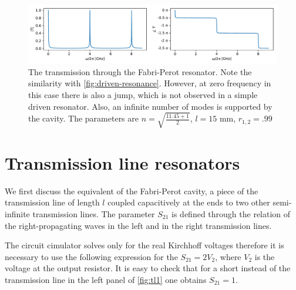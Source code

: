 \documentclass{article}
\begin{document}
	\begin{figure}
		\centering
		\includegraphics[width=1\linewidth]{Pictures/Plotting/fabri-perot}
		\caption{The transmission through the Fabri-Perot resonator. Note the similarity with \autoref{fig:driven-resonance}. However, at zero frequency in this case there is also a jump, which is not observed in a simple driven resonator. Also, an infinite number of modes is supported by the cavity. The parameters are $n = \sqrt{\frac{11.45+1}{2}}$, $l=15$ mm, $r_{1,2} = .99$ }
		\label{fig:fabri-perot}
	\end{figure}

	
	\section{Transmission line resonators}
	
	We first discuss the equivalent of the Fabri-Perot cavity, a piece of the transmission line of length $l$ coupled capacitively at the ends to two other semi-infinite transmission lines. The parameter $S_{21}$ is defined through the relation of the right-propagating waves in the left and in the right transmission lines.
	
	The circuit cimulator solves only for the real Kirchhoff voltages therefore it is necessary to use the following expression for the $S_{21} = 2 V_2 $, where $V_2$ is the voltage at the output resistor. It is easy to check that for a short instead of the transmission line in the left panel of \autoref{fig:tl1} one obtains $ S_{21}  = 1$.
	
\end{document}
